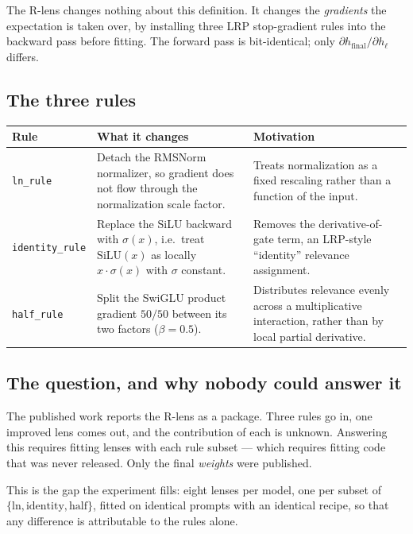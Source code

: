 \documentclass[11pt,a4paper]{article}
\newcommand{\rlens}{R\nobreakdash-lens}
\newcommand{\cfg}[1]{\texttt{#1}}
\begin{document}
The \rlens{} changes nothing about this definition. It changes the \emph{gradients}
the expectation is taken over, by installing three LRP stop-gradient rules into the
backward pass before fitting. The forward pass is bit-identical; only $\partial
h_{\text{final}}/\partial h_\ell$ differs.

\subsection{The three rules}

\begin{longtable}{@{}p{}p{}p{}@{}}
\toprule
\textbf{Rule} & \textbf{What it changes} & \textbf{Motivation} \\
\midrule
\endhead
\cfg{ln\_rule} & Detach the RMSNorm normalizer, so gradient does not flow through the
  normalization scale factor. & Treats normalization as a fixed rescaling rather than
  a function of the input. \\
\addlinespace
\cfg{identity\_rule} & Replace the SiLU backward with $\sigma(x)$, i.e.\ treat
  $\mathrm{SiLU}(x)$ as locally $x \cdot \sigma(x)$ with $\sigma$ constant. & Removes
  the derivative-of-gate term, an LRP-style ``identity'' relevance assignment. \\
\addlinespace
\cfg{half\_rule} & Split the SwiGLU product gradient $50/50$ between its two factors
  ($\beta = 0.5$). & Distributes relevance evenly across a multiplicative
  interaction, rather than by local partial derivative. \\
\bottomrule
\end{longtable}

\subsection{The question, and why nobody could answer it}

The published work reports the \rlens{} as a package. Three rules go in, one improved
lens comes out, and the contribution of each is unknown. Answering this requires
fitting lenses with each rule subset --- which requires fitting code that was never
released. Only the final \emph{weights} were published.

This is the gap the experiment fills: eight lenses per model, one per subset of
$\{\text{ln}, \text{identity}, \text{half}\}$, fitted on identical prompts with an
identical recipe, so that any difference is attributable to the rules alone.
\end{document}
